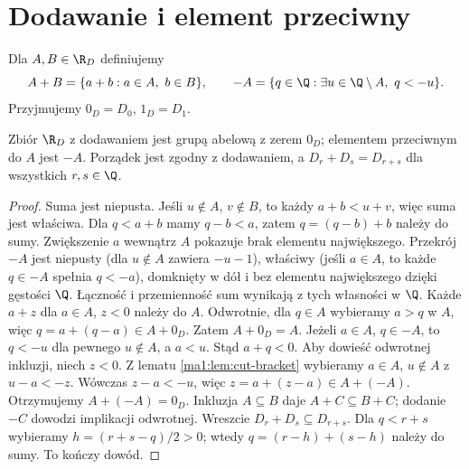 \section{Dodawanie i element przeciwny}
\label{ma1:sec:cut-addition}
\begin{definicja}
Dla $A,B\in\R_D$ definiujemy
\[
 A+B=\{a+b:a\in A,\ b\in B\},\qquad
 -A=\{q\in\Q:\exists u\in\Q\setminus A,\ q<-u\}.
\]
Przyjmujemy $0_D=D_0$, $1_D=D_1$.
\end{definicja}
\begin{twierdzenie}
\label{ma1:thm:cut-group}
Zbiór $\R_D$ z dodawaniem jest grupą abelową z zerem $0_D$; elementem przeciwnym do $A$ jest $-A$. Porządek jest zgodny z dodawaniem, a $D_r+D_s=D_{r+s}$ dla wszystkich $r,s\in\Q$.
\end{twierdzenie}
\begin{proof}
Suma jest niepusta. Jeśli $u\notin A$, $v\notin B$, to każdy $a+b<u+v$, więc suma jest właściwa. Dla $q<a+b$ mamy $q-b<a$, zatem $q=(q-b)+b$ należy do sumy. Zwiększenie $a$ wewnątrz $A$ pokazuje brak elementu największego. Przekrój $-A$ jest niepusty (dla $u\notin A$ zawiera $-u-1$), właściwy (jeśli $a\in A$, to każde $q\in -A$ spełnia $q<-a$), domknięty w dół i bez elementu największego dzięki gęstości $\Q$.
Łączność i przemienność sum wynikają z tych własności w $\Q$. Każde $a+z$ dla $a\in A$, $z<0$ należy do $A$. Odwrotnie, dla $q\in A$ wybieramy $a>q$ w $A$, więc $q=a+(q-a)\in A+0_D$. Zatem $A+0_D=A$.
Jeżeli $a\in A$, $q\in -A$, to $q<-u$ dla pewnego $u\notin A$, a $a<u$. Stąd $a+q<0$. Aby dowieść odwrotnej inkluzji, niech $z<0$. Z lematu \ref{ma1:lem:cut-bracket} wybieramy $a\in A$, $u\notin A$ z $u-a<-z$. Wówczas $z-a<-u$, więc $z=a+(z-a)\in A+(-A)$. Otrzymujemy $A+(-A)=0_D$.
Inkluzja $A\subseteq B$ daje $A+C\subseteq B+C$; dodanie $-C$ dowodzi implikacji odwrotnej. Wreszcie $D_r+D_s\subseteq D_{r+s}$. Dla $q<r+s$ wybieramy $h=(r+s-q)/2>0$; wtedy $q=(r-h)+(s-h)$ należy do sumy. To kończy dowód.
\end{proof}

